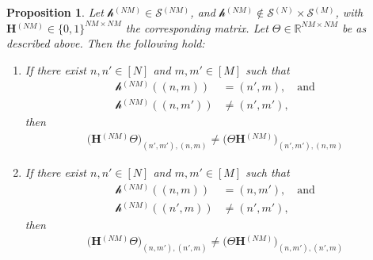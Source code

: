 \documentclass{article}
\newcommand{\mat}[1]{\ensuremath{\mathbf{#1}}}
\newcommand{\gr}[1]{\ensuremath{\mathcal{#1}}}
\newcommand{\set}[1]{\ensuremath{\mathbb{#1}}}
\newcommand{\prm}[1]{\ensuremath{^{(#1)}}}
\newcommand{\grn}[2]{\ensuremath{\gr{#1}\prm{#2}}}
\renewcommand{\Re}[0]{\ensuremath{\set{R}}}
\newtheorem{proposition}[theorem]{Proposition}
\theoremstyle{definition}
\begin{document}
\begin{proposition}\label{prop:H2}
Let $\grn{h}{NM} \in \grn{S}{NM}$, and $\grn{h}{NM} \not\in \grn{S}{N} \times \grn{S}{M}$, with $\mat{H}\prm{NM} \in \{0,1\}^{NM \times NM}$ the corresponding matrix. Let $\Theta \in \Re^{NM \times NM}$ be as described above. Then the following hold:
  \begin{enumerate}
    \item[(i)]
      If there exist $n, n' \in [N]$ and $m, m' \in [M]$ such that 
      \begin{align*}
        \grn{h}{NM}((n, m)) &= (n', m), \quad \text{and} \\
        \grn{h}{NM}((n, m')) &\neq (n', m'), 
      \end{align*}
      then
      \begin{align*}
        \big( \mat{H}\prm{N M} \Theta \big)_{(n',m'), (n,m)} \neq \big( \Theta \mat{H}\prm{N M} \big)_{(n',m'), (n,m)}
      \end{align*}
    \item[(ii)]
      If there exist $n, n' \in [N]$ and $m, m' \in [M]$ such that 
      \begin{align*}
        \grn{h}{NM}((n, m)) &= (n, m'), \quad \text{and} \\
        \grn{h}{NM}((n', m)) &\neq (n', m'), 
      \end{align*}
      then
      \begin{align*}
        \big( \mat{H}\prm{N M} \Theta \big)_{(n,m'), (n',m)} \neq \big( \Theta \mat{H}\prm{N M} \big)_{(n,m'), (n',m)}
      \end{align*}
  \end{enumerate}
\end{proposition}
\end{document}
